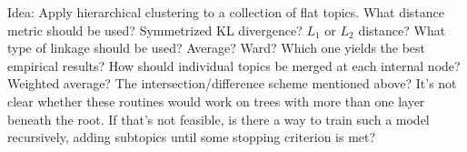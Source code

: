 \documentclass{article}
\begin{document}
\begin{outline}
  \2 Idea: Apply hierarchical clustering to a collection of flat topics.
    \3 What distance metric should be used?  Symmetrized KL divergence?  $L_1$ or $L_2$ distance?
    \3 What type of linkage should be used?  Average?  Ward?  Which one yields the best empirical results?
    \3 How should individual topics be merged at each internal node?  Weighted average?  The intersection/difference scheme mentioned above?
  \2 It's not clear whether these routines would work on trees with more than one layer beneath the root.  If that's not feasible, is there a way to train such a model recursively, adding subtopics until some stopping criterion is met?
\end{outline}

%
%
\end{document}
